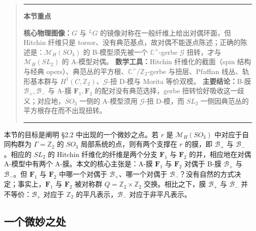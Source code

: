 \documentclass[11pt,a4paper]{article}
\newenvironment{keytakeaway}
  {\par\medskip\begin{quote}\small\noindent
   \rule{\linewidth}{0.6pt}\par\nopagebreak\smallskip\noindent
   \textbf{本节重点}\par\nobreak\smallskip\noindent\ignorespaces}
  {\par\smallskip\noindent\rule{\linewidth}{0.6pt}\end{quote}\medskip}
\begin{document}
\begin{keytakeaway}
\textbf{核心物理图像：}$G$ 与 ${}^{L}G$ 的镜像对称在一般纤维上给出对偶环面，但 Hitchin 纤维只是 torsor、没有典范基点，故对偶不能逐点陈述；正确的陈述是：$\mathcal{M}_H(SO_3)$ 的 B-模型须先被一个 $\mathbb{C}^\times$-gerbe $\mathcal{G}$ 扭转，才与 $\mathcal{M}_H(SL_2)$ 的 A-模型对偶。
\textbf{数学工具：}Hitchin 纤维化的截面（spin 结构与经典 opers）、典范丛的平方根、$\mathbb{C}^\times$/$\mathbb{Z}_2$-gerbe 与扭层、Pfaﬃan 线丛、轨形基本群与 $H^1(C,\mathbb{Z}_2)$、$\mathcal{G}$-扭 D-模与 Morita 等价双模。
\textbf{主要结论：}B-膜 $\mathcal{B}_+,\mathcal{B}_-$ 与 A-膜 $\boldsymbol{F}_1,\boldsymbol{F}_2$ 的配对没有典范选择，gerbe 扭转恰好吸收这一歧义；对应地，$SO_3$ 一侧的 A-模型须用 $\mathcal{G}$-扭 D-模，而 $SL_2$ 一侧因典范丛的平方根存在而不出现扭转。
\end{keytakeaway}

本节的目标是阐明 §2.2 中出现的一个微妙之点。若 $r$ 是 $\mathcal{M}_H(SO_3)$ 中对应于自同构群为 $\Gamma=\mathbb{Z}_2$ 的 $SO_3$ 局部系统的点，则有两个支撑在 $r$ 的膜，即 $\mathcal{B}_+$ 与 $\mathcal{B}_-$。相应的 $SL_2$ 的 Hitchin 纤维化的纤维是两个分支 $\boldsymbol{F}_1$ 与 $\boldsymbol{F}_2$ 的并，相应地在对偶 A-模型中有两个 A-膜。本文的核心主张是：A-膜 $\boldsymbol{F}_1$ 与 $\boldsymbol{F}_2$ 对偶于 B-膜 $\mathcal{B}_+$ 与 $\mathcal{B}_-$。但 $\boldsymbol{F}_1$ 与 $\boldsymbol{F}_2$ 中哪一个对偶于 $\mathcal{B}_+$、哪一个对偶于 $\mathcal{B}_-$？没有自然的方式决定；事实上，$\boldsymbol{F}_1$ 与 $\boldsymbol{F}_2$ 被对称群 $Q=\mathbb{Z}_2\times\mathbb{Z}_2$ 交换。相比之下，膜 $\mathcal{B}_+$ 与 $\mathcal{B}_-$ 并不等价：$\mathcal{B}_+$ 对应于 $\mathbb{Z}_2$ 的平凡表示，$\mathcal{B}_-$ 对应于非平凡表示。

\subsection{一个微妙之处}

\end{document}
